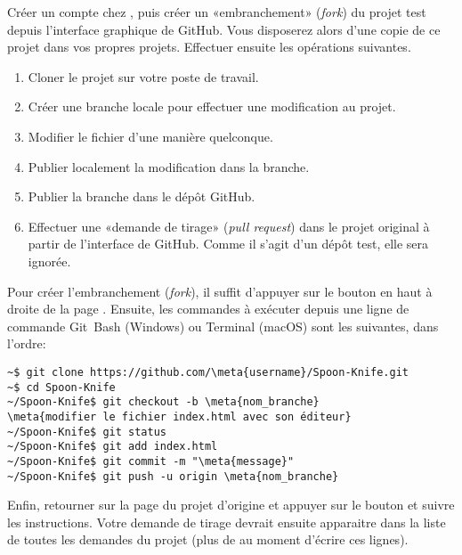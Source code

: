 \begin{exercice}
  Créer un compte chez , puis créer
  un «embranchement» (\emph{fork}) du projet test
   depuis
  l'interface graphique de GitHub. Vous disposerez alors d'une copie
  de ce projet dans vos propres projets. Effectuer ensuite les
  opérations suivantes.
  \begin{enumerate}
  \item Cloner le projet sur votre poste de travail.
  \item Créer une branche locale pour effectuer une modification au
    projet.
  \item Modifier le fichier  d'une manière
    quelconque.
  \item Publier localement la modification dans la branche.
  \item Publier la branche dans le dépôt GitHub.
  \item Effectuer une «demande de tirage» (\emph{pull request}) dans
    le projet original à partir de l'interface de GitHub. Comme il
    s'agit d'un dépôt test, elle sera ignorée.
  \end{enumerate}

  \begin{sol}
    Pour créer l'embranchement (\emph{fork}), il suffit d'appuyer sur
    le bouton  en haut à droite de la page
    .
    Ensuite, les commandes à exécuter depuis une ligne de commande
    Git~Bash (Windows) ou Terminal
    (macOS) sont les suivantes, dans l'ordre:
\begin{Schunk}
\begin{Verbatim}[commandchars=\\\{\},fontsize=\relsize{-1}]
~$ git clone https://github.com/\meta{username}/Spoon-Knife.git
~$ cd Spoon-Knife
~/Spoon-Knife$ git checkout -b \meta{nom_branche}
\meta{modifier le fichier index.html avec son éditeur}
~/Spoon-Knife$ git status
~/Spoon-Knife$ git add index.html
~/Spoon-Knife$ git commit -m "\meta{message}"
~/Spoon-Knife$ git push -u origin \meta{nom_branche}
\end{Verbatim}
\end{Schunk}
    Enfin, retourner sur la page du projet d'origine et appuyer sur le
    bouton  et suivre les instructions.
    Votre demande de tirage devrait ensuite apparaitre dans la liste
    de toutes les demandes du projet (plus de  au moment
    d'écrire ces lignes).
  \end{sol}
\end{exercice}



